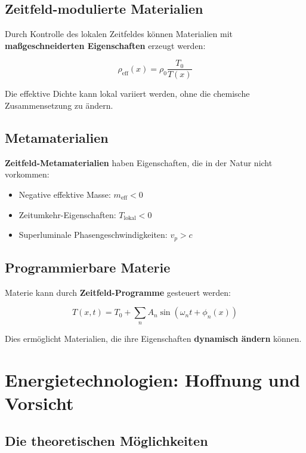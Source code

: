 \documentclass[12pt,a4paper]{report}
\begin{document}
	\subsection{Zeitfeld-modulierte Materialien}
	
	Durch Kontrolle des lokalen Zeitfeldes können Materialien mit \textbf{maßgeschneiderten Eigenschaften} erzeugt werden:
	
	\begin{equation}
		\rho_{\text{eff}}(x) = \rho_0 \frac{T_0}{T(x)}
	\end{equation}
	
	Die effektive Dichte kann lokal variiert werden, ohne die chemische Zusammensetzung zu ändern.
	
	\subsection{Metamaterialien}
	
	\textbf{Zeitfeld-Metamaterialien} haben Eigenschaften, die in der Natur nicht vorkommen:
	
	\begin{itemize}
		\item Negative effektive Masse: $m_{\text{eff}} < 0$
		\item Zeitumkehr-Eigenschaften: $T_{\text{lokal}} < 0$
		\item Superluminale Phasengeschwindigkeiten: $v_p > c$
	\end{itemize}
	
	\subsection{Programmierbare Materie}
	
	Materie kann durch \textbf{Zeitfeld-Programme} gesteuert werden:
	
	\begin{equation}
		T(x,t) = T_0 + \sum_n A_n \sin(\omega_n t + \phi_n(x))
	\end{equation}
	
	Dies ermöglicht Materialien, die ihre Eigenschaften \textbf{dynamisch ändern} können.
	
	\section{Energietechnologien: Hoffnung und Vorsicht}
	
	\subsection{Die theoretischen Möglichkeiten}
	
\end{document}
